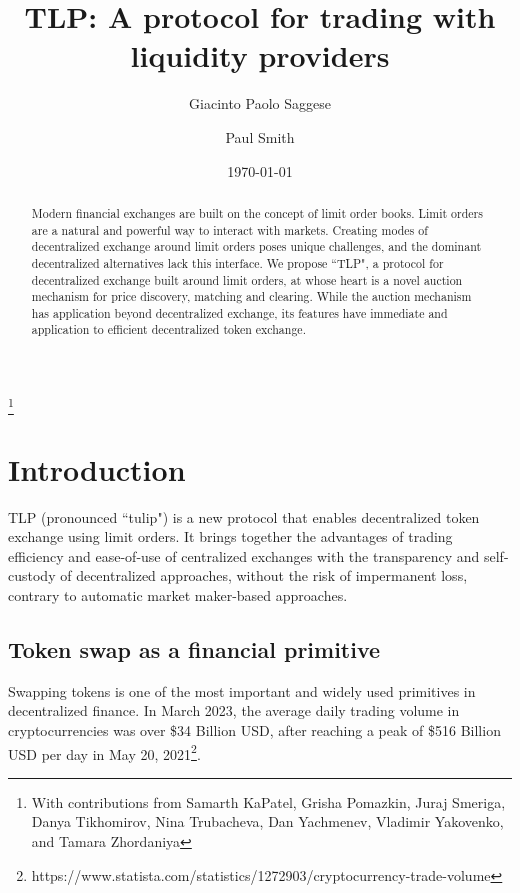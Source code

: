 \documentclass[11pt, reqno]{amsart}
\theoremstyle{definition}
\theoremstyle{remark}
\begin{document}
\title{TLP: A protocol for trading with liquidity providers}

\author{Giacinto Paolo Saggese}
\author{Paul Smith}

\thanks{With contributions from
	Samarth KaPatel,
	Grisha Pomazkin,
	Juraj Smeriga,
	Danya Tikhomirov,
	Nina Trubacheva,
	Dan Yachmenev,
	Vladimir Yakovenko,
	and
	Tamara Zhordaniya}

\date{\today}

\maketitle

\begin{abstract}
Modern financial exchanges are built on the concept of limit order books. Limit
orders are a natural and powerful way to interact with markets. Creating modes
of decentralized exchange around limit orders poses unique challenges, and the
dominant decentralized alternatives lack this interface. We propose ``TLP", a
protocol for decentralized exchange built around limit orders, at whose heart
is a novel auction mechanism for price discovery, matching and clearing. While
the auction mechanism has application beyond decentralized exchange, its
features have immediate and application to efficient decentralized token
exchange.
\end{abstract}

\tableofcontents


\section{Introduction}

TLP (pronounced ``tulip") is a new protocol that enables decentralized token
exchange using limit orders. It brings together the advantages of trading
efficiency and ease-of-use of centralized exchanges with the transparency and
self-custody of decentralized approaches, without the risk of impermanent loss,
contrary to automatic market maker-based approaches.

\subsection{Token swap as a financial primitive}
Swapping tokens is one of the most important and widely used primitives in
decentralized finance.
In March 2023, the average daily trading volume in cryptocurrencies was over
\$34 Billion USD, after reaching a peak of \$516 Billion USD per day in May 20,
2021\footnote{https://www.statista.com/statistics/1272903/cryptocurrency-trade-volume}.
\end{document}
